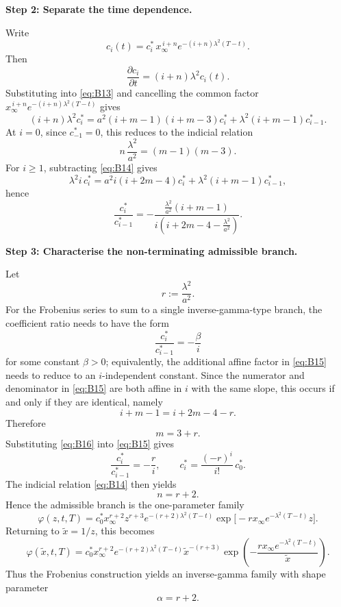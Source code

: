\documentclass[12pt]{article}
\theoremstyle{statementstyle}
\begin{document}
\begin{appendices}
\medskip
\noindent\textbf{Step 2: Separate the time dependence.}

Write
\[
c_i(t)=c_i^{*}\,x_{\infty}^{\,i+n}e^{-(i+n)\lambda^{2}(T-t)}.
\]
Then
\[
\frac{\partial c_i}{\partial t}=(i+n)\lambda^{2}c_i(t).
\]
Substituting into \eqref{eq:B13} and cancelling the common factor
\(x_{\infty}^{\,i+n}e^{-(i+n)\lambda^{2}(T-t)}\) gives
\[
(i+n)\lambda^{2}c_i^{*}
=
a^{2}(i+m-1)(i+m-3)c_i^{*}
+
\lambda^{2}(i+m-1)c_{i-1}^{*}.
\]
At \(i=0\), since \(c_{-1}^{*}=0\), this reduces to the indicial relation
\begin{equation}
n\,\frac{\lambda^{2}}{a^{2}}=(m-1)(m-3).
\tag{B.1.4}\label{eq:B14}
\end{equation}
For \(i\ge 1\), subtracting \eqref{eq:B14} gives
\[
\lambda^{2} i\,c_i^{*}
=
a^{2}i(i+2m-4)c_i^{*}
+
\lambda^{2}(i+m-1)c_{i-1}^{*},
\]
hence
\begin{equation}
\frac{c_i^{*}}{c_{i-1}^{*}}
=
-\frac{\frac{\lambda^{2}}{a^{2}}(i+m-1)}{i\left(i+2m-4-\frac{\lambda^{2}}{a^{2}}\right)}.
\tag{B.1.5}\label{eq:B15}
\end{equation}

\medskip
\noindent\textbf{Step 3: Characterise the non-terminating admissible branch.}

Let
\[
r:=\frac{\lambda^{2}}{a^{2}}.
\]
For the Frobenius series to sum to a single inverse-gamma-type branch,
the coefficient ratio needs to have the form
\[
\frac{c_i^{*}}{c_{i-1}^{*}}=-\frac{\beta}{i}
\]
for some constant \(\beta>0\); equivalently, the additional affine factor
in \eqref{eq:B15} needs to reduce to an \(i\)-independent constant. Since the
numerator and denominator in \eqref{eq:B15} are both affine in \(i\) with
the same slope, this occurs if and only if they are identical, namely
\[
i+m-1=i+2m-4-r.
\]
Therefore
\begin{equation}
m=3+r.
\tag{B.1.6}\label{eq:B16}
\end{equation}
Substituting \eqref{eq:B16} into \eqref{eq:B15} gives
\begin{equation}
\frac{c_i^{*}}{c_{i-1}^{*}}=-\frac{r}{i},
\qquad
c_i^{*}=\frac{(-r)^i}{i!}\,c_0^{*}.
\tag{B.1.7}\label{eq:B17}
\end{equation}
The indicial relation \eqref{eq:B14} then yields
\begin{equation}
n=r+2.
\tag{B.1.8}\label{eq:B18}
\end{equation}
Hence the admissible branch is the one-parameter family
\[
\varphi(z,t,T)
=
c_0^{*}x_{\infty}^{r+2}z^{r+3}e^{-(r+2)\lambda^{2}(T-t)}
\exp\!\bigl[-r x_{\infty}e^{-\lambda^{2}(T-t)}z\bigr].
\]
Returning to \(\widetilde{x}=1/z\), this becomes
\begin{equation}
\varphi(\widetilde{x},t,T)
=
c_0^{*}x_{\infty}^{r+2}e^{-(r+2)\lambda^{2}(T-t)}
\widetilde{x}^{-(r+3)}
\exp\!\left(-\frac{r x_{\infty}e^{-\lambda^{2}(T-t)}}{\widetilde{x}}\right).
\tag{B.1.9}\label{eq:B19}
\end{equation}
Thus the Frobenius construction yields an inverse-gamma family with shape
parameter
\[
\alpha=r+2.
\]


\end{appendices}
\end{document}

